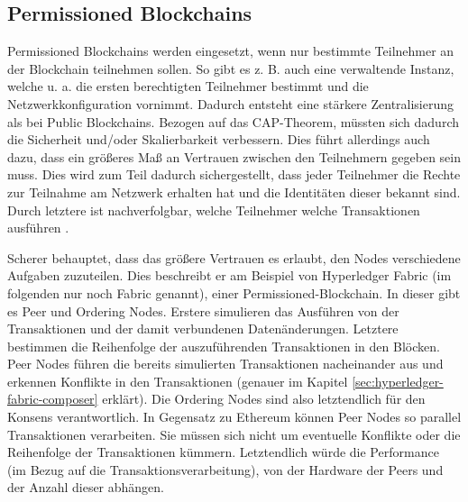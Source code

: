 \subsection{Permissioned Blockchains}
Permissioned Blockchains werden eingesetzt, wenn nur bestimmte Teilnehmer an der Blockchain teilnehmen sollen. So gibt es z. B. auch eine verwaltende Instanz, welche u. a. die ersten berechtigten Teilnehmer bestimmt und die Netzwerkkonfiguration vornimmt. Dadurch entsteht eine stärkere Zentralisierung als bei Public Blockchains. Bezogen auf das CAP-Theorem, müssten sich dadurch die Sicherheit und/oder Skalierbarkeit verbessern. Dies führt allerdings auch dazu, dass ein größeres Maß an Vertrauen zwischen den Teilnehmern gegeben sein muss. Dies wird zum Teil dadurch sichergestellt, dass jeder Teilnehmer die Rechte zur Teilnahme am Netzwerk erhalten hat und die Identitäten dieser bekannt sind. Durch letztere ist nachverfolgbar, welche Teilnehmer welche Transaktionen ausführen \cite{SchererPerformanceScalabilityBlockchain2017}.

Scherer behauptet, dass das größere Vertrauen es erlaubt, den Nodes verschiedene Aufgaben zuzuteilen. Dies beschreibt er am Beispiel von Hyperledger Fabric (im folgenden nur noch Fabric genannt), einer Permissioned-Blockchain. In dieser gibt es Peer und Ordering Nodes. Erstere simulieren das Ausführen von der Transaktionen und der damit verbundenen Datenänderungen. Letztere bestimmen die Reihenfolge der auszuführenden Transaktionen in den Blöcken. Peer Nodes führen die bereits simulierten Transaktionen nacheinander aus und erkennen Konflikte in den Transaktionen (genauer im Kapitel \ref{sec:hyperledger-fabric-composer} erklärt). Die Ordering Nodes sind also letztendlich für den Konsens verantwortlich. In Gegensatz zu Ethereum können Peer Nodes so parallel Transaktionen verarbeiten. Sie müssen sich nicht um eventuelle Konflikte oder die Reihenfolge der Transaktionen kümmern. Letztendlich würde die Performance (im Bezug auf die Transaktionsverarbeitung), von der Hardware der Peers und der Anzahl dieser abhängen.

